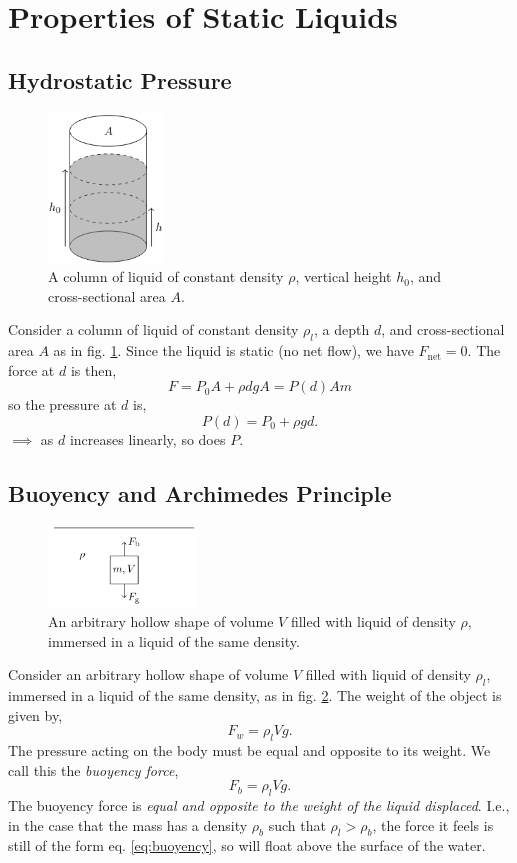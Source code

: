 \documentclass{book}
\begin{document}
\section{Properties of Static Liquids}
\subsection{Hydrostatic Pressure}
\begin{figure}
	\centering
	\includegraphics[height=150px]{hydrostatic.png}
	\caption{A column of liquid of constant density $\rho$, vertical height $h_0$, and cross-sectional area $A$.} \label{fig:hydrostatic}
\end{figure}
Consider a column of liquid of constant density $\rho_l$, a depth $d$, and cross-sectional area $A$ as in fig. \ref{fig:hydrostatic}. Since the liquid is static (no net flow), we have $F_{\text{net}} = 0$. The force at $d$ is then,
\begin{equation}
	F = P_0A + \rho d g A = P(d)Am
\end{equation}
so the pressure at $d$ is,
\begin{equation}
	\boxed{P(d) = P_0 + \rho g d}.
\end{equation}
$\implies$ as $d$ increases linearly, so does $P$.
\subsection{Buoyency and Archimedes Principle}
\begin{figure}
	\centering
	\includegraphics[width=150px]{archimedes.png}
	\caption{An arbitrary hollow shape of volume $V$ filled with liquid of density $\rho$, immersed in a liquid of the same density.} \label{fig:archimedes}
\end{figure}
Consider an arbitrary hollow shape of volume $V$ filled with liquid of density $\rho_l$, immersed in a liquid of the same density, as in fig. \ref{fig:archimedes}. The weight of the object is given by,
\begin{equation}
	F_w = \rho_l V g.
\end{equation}
The pressure acting on the body must be equal and opposite to its weight. We call this the \textit{buoyency force},
\begin{equation}
	\boxed{F_b = \rho_l V g}. \label{eq:buoyency}
\end{equation}
The buoyency force is \textit{equal and opposite to the weight of the liquid displaced}. I.e., in the case that the mass has a density $\rho_b$ such that $\rho_l > \rho_b$, the force it feels is still of the form eq. \eqref{eq:buoyency}, so will float above the surface of the water.
\end{document}
